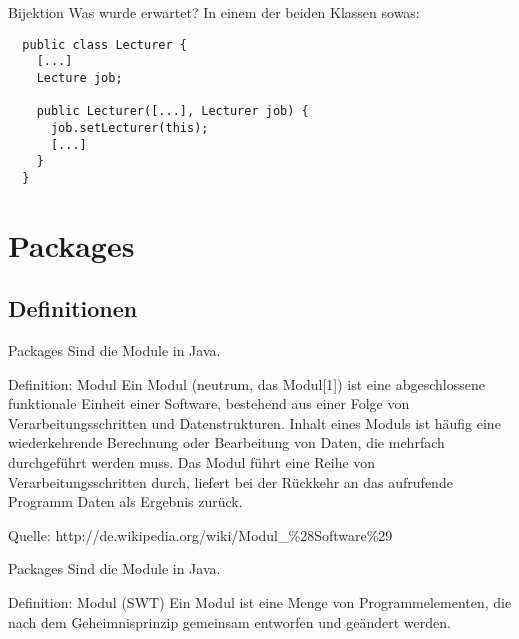 \documentclass[18pt]{beamer}
\begin{document}
\begin{frame}[fragile]{Bijektion}
 Was wurde erwartet? \pause
 In einem der beiden Klassen sowas:
 \begin{lstlisting}
  public class Lecturer {
    [...]
    Lecture job;
    
    public Lecturer([...], Lecturer job) {
      job.setLecturer(this);
      [...]
    }
  }
 \end{lstlisting}

\end{frame}

\section{Packages}
\subsection{Definitionen}
\begin{frame}{Packages}
 Sind die Module in Java. \pause
 
 \begin{exampleblock}{Definition: Modul}
  Ein Modul (neutrum, das Modul[1]) ist eine abgeschlossene funktionale Einheit einer Software, 
  bestehend aus einer Folge von Verarbeitungsschritten und Datenstrukturen. Inhalt eines Moduls ist
  häufig eine wiederkehrende Berechnung oder Bearbeitung von Daten, die mehrfach durchgeführt 
  werden muss. Das Modul führt eine Reihe von Verarbeitungsschritten durch, liefert bei der 
  Rückkehr an das aufrufende Programm Daten als Ergebnis zurück.
  
  \tiny{Quelle: http://de.wikipedia.org/wiki/Modul\_\%28Software\%29 }
 \end{exampleblock}

\end{frame}

\begin{frame}{Packages}
 Sind die Module in Java. \pause
 
 \begin{exampleblock}{Definition: Modul (SWT)}
 Ein Modul ist eine Menge von Programmelementen, die nach dem Geheimnisprinzip gemeinsam entworfen und geändert werden.

 \end{exampleblock}

\end{frame}
\end{document}
